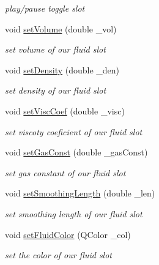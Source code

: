 \begin{DoxyCompactItemize}
\begin{DoxyCompactList}\small\item\em play/pause toggle slot \end{DoxyCompactList}\item 
void \hyperlink{class_open_g_l_widget_a4f9cc5b8135515ea87870585dfdf194b}{set\-Volume} (double \-\_\-vol)
\begin{DoxyCompactList}\small\item\em set volume of our fluid slot \end{DoxyCompactList}\item 
void \hyperlink{class_open_g_l_widget_a2b1f58185ccc07782cc8c1d6f8f73863}{set\-Density} (double \-\_\-den)
\begin{DoxyCompactList}\small\item\em set density of our fluid slot \end{DoxyCompactList}\item 
void \hyperlink{class_open_g_l_widget_a2476342258d25fafecb7e784373141e4}{set\-Visc\-Coef} (double \-\_\-visc)
\begin{DoxyCompactList}\small\item\em set viscoty coeficient of our fluid slot \end{DoxyCompactList}\item 
void \hyperlink{class_open_g_l_widget_a5e4e0ff0bd8f6fad5fd1fb53265dc814}{set\-Gas\-Const} (double \-\_\-gas\-Const)
\begin{DoxyCompactList}\small\item\em set gas constant of our fluid slot \end{DoxyCompactList}\item 
void \hyperlink{class_open_g_l_widget_a0806c995ed218e055cab1f9c177a6818}{set\-Smoothing\-Length} (double \-\_\-len)
\begin{DoxyCompactList}\small\item\em set smoothing length of our fluid slot \end{DoxyCompactList}\item 
\hypertarget{class_open_g_l_widget_aba6ed78cded62034694d981d1e2e2219}{void \hyperlink{class_open_g_l_widget_aba6ed78cded62034694d981d1e2e2219}{set\-Fluid\-Color} (Q\-Color \-\_\-col)}\label{class_open_g_l_widget_aba6ed78cded62034694d981d1e2e2219}

\begin{DoxyCompactList}\small\item\em set the color of our fluid slot \end{DoxyCompactList}\end{DoxyCompactItemize}
